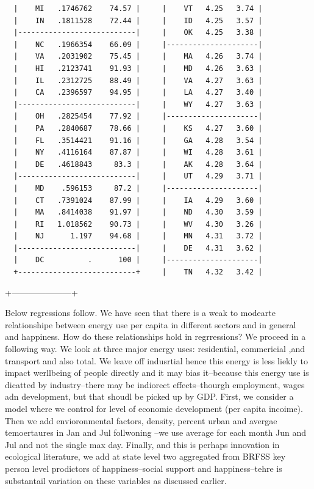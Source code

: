 \documentclass[10pt, letterpaper]{article}
\begin{document}
\begin{spacing}{1.4}
\begin{spacing}{.8}
\begin{verbatim}
  |    MI   .1746762    74.57 |     |    VT   4.25   3.74 | 
  |    IN   .1811528    72.44 |     |    ID   4.25   3.57 | 
  |---------------------------|     |    OK   4.25   3.38 | 
  |    NC   .1966354    66.09 |     |---------------------| 
  |    VA   .2031902    75.45 |     |    MA   4.26   3.74 | 
  |    HI   .2123741    91.93 |     |    MD   4.26   3.63 | 
  |    IL   .2312725    88.49 |     |    VA   4.27   3.63 | 
  |    CA   .2396597    94.95 |     |    LA   4.27   3.40 | 
  |---------------------------|     |    WY   4.27   3.63 | 
  |    OH   .2825454    77.92 |     |---------------------| 
  |    PA   .2840687    78.66 |     |    KS   4.27   3.60 | 
  |    FL   .3514421    91.16 |     |    GA   4.28   3.54 | 
  |    NY   .4116164    87.87 |     |    WI   4.28   3.61 | 
  |    DE   .4618843     83.3 |     |    AK   4.28   3.64 | 
  |---------------------------|     |    UT   4.29   3.71 | 
  |    MD    .596153     87.2 |     |---------------------| 
  |    CT   .7391024    87.99 |     |    IA   4.29   3.60 | 
  |    MA   .8414038    91.97 |     |    ND   4.30   3.59 | 
  |    RI   1.018562    90.73 |     |    WV   4.30   3.26 | 
  |    NJ      1.197    94.68 |     |    MN   4.31   3.72 | 
  |---------------------------|     |    DE   4.31   3.62 | 
  |    DC          .      100 |     |---------------------| 
  +---------------------------+     |    TN   4.32   3.42 | 
\end{verbatim}                      +---------------------+ 
\end{spacing}


Below regressions follow.  We have
seen that there is a weak to modearte relationshipe between energy use per
capita in different sectors and in general and happiness. How do these
relationships hold in regrressions? We proceed in a following way. We look at
three major energy uses: residential, commericial ,and transport  and also
total. We leave off indusrtial hence this energy is less liekly to impact
werllbeing of people directly and it may bias it--because this energy use is
dicatted by industry--there may be indiorect effects--thourgh employment, wages
adn development, but that shoudl be picked up by GDP. 
First, we
consider a model where we control for level of economic development (per capita
incoime). Then we add envioronmental factors, density, percent urban and avergae
temoertaures in Jan and Jul follwoning \cite{abdallah08al, brereton08}--we use
average for each month Jun and Jul and not the single max day. Finally, and this
is perhaps innovation in ecological literature, we add at state level two
aggregated from BRFSS key person level prodictors of happiness--social support
and happiness--tehre is substantail variation on these variables as discussed earlier.


\end{spacing}
\end{document}
